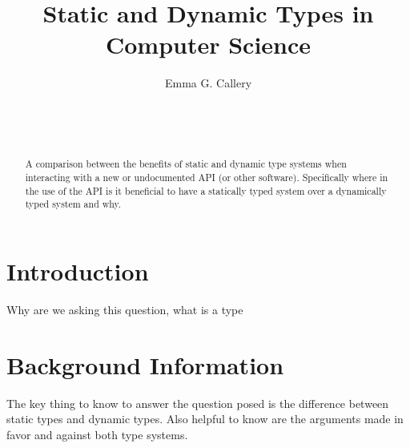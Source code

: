 \documentclass{sig-alternate}
\begin{document}
\title{Static and Dynamic Types in Computer Science}
\author{
\alignauthor
Emma G. Callery\\
	\\
	\\
	\\
}

\maketitle

\begin{abstract}
A comparison between the benefits of static and dynamic type systems when interacting with a new or undocumented API (or other software). Specifically where in the use of the API is it beneficial to have a statically typed system over a dynamically typed system and why. 
\end{abstract}


\section{Introduction}
Why are we asking this question, what is a type

\section{Background Information} 
The key thing to know to answer the question posed is the difference between static types and dynamic types. Also helpful to know are the arguments made in favor and against both type systems.
\end{document}
